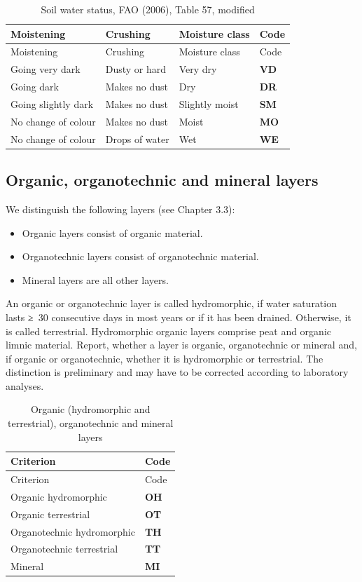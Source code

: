 \documentclass[
  letterpaper,
  DIV=11,
  numbers=noendperiod]{scrreprt}
\providecommand{\tightlist}{%
  \setlength{\itemsep}{0pt}\setlength{\parskip}{0pt}}\usepackage{longtable,booktabs,array}
\begin{document}
\begin{longtable}[]{@{}llll@{}}
\caption{Soil water status, FAO (2006), Table 57,
modified}\tabularnewline
\toprule()
Moistening & Crushing & Moisture class & Code \\
\midrule()
\endfirsthead
\toprule()
Moistening & Crushing & Moisture class & Code \\
\midrule()
\endhead
Going very dark & Dusty or hard & Very dry & \textbf{VD} \\
Going dark & Makes no dust & Dry & \textbf{DR} \\
Going slightly dark & Makes no dust & Slightly moist & \textbf{SM} \\
No change of colour & Makes no dust & Moist & \textbf{MO} \\
No change of colour & Drops of water & Wet & \textbf{WE} \\
\bottomrule()
\end{longtable}

\hypertarget{organic-organotechnic-and-mineral-layers}{%
\subsection{Organic, organotechnic and mineral
layers}\label{organic-organotechnic-and-mineral-layers}}

We distinguish the following layers (see Chapter 3.3):

\begin{itemize}
\tightlist
\item
  Organic layers consist of organic material.
\item
  Organotechnic layers consist of organotechnic material.
\item
  Mineral layers are all other layers.
\end{itemize}

An organic or organotechnic layer is called hydromorphic, if water
saturation lasts ≥~30 consecutive days in most years or if it has been
drained. Otherwise, it is called terrestrial. Hydromorphic organic
layers comprise peat and organic limnic material. Report, whether a
layer is organic, organotechnic or mineral and, if organic or
organotechnic, whether it is hydromorphic or terrestrial. The
distinction is preliminary and may have to be corrected according to
laboratory analyses.

\begin{longtable}[]{@{}ll@{}}
\caption{Organic (hydromorphic and terrestrial), organotechnic and
mineral layers}\tabularnewline
\toprule()
Criterion & Code \\
\midrule()
\endfirsthead
\toprule()
Criterion & Code \\
\midrule()
\endhead
Organic hydromorphic & \textbf{OH} \\
Organic terrestrial & \textbf{OT} \\
Organotechnic hydromorphic & \textbf{TH} \\
Organotechnic terrestrial & \textbf{TT} \\
Mineral & \textbf{MI} \\
\bottomrule()
\end{longtable}
\end{document}
